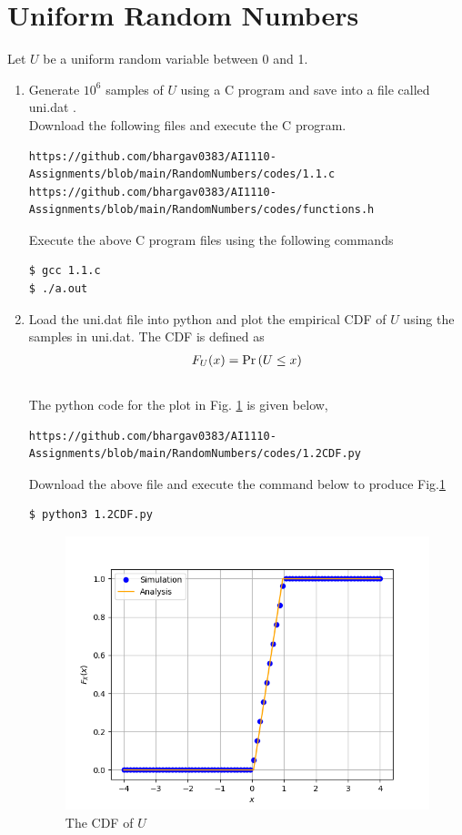 \documentclass[journal,12pt,twocolumn]{IEEEtran}
\begin{document}
\section{Uniform Random Numbers}
Let $U$ be a uniform random variable between 0 and 1.
\begin{enumerate}[label=\thesection.\arabic*
,ref=\thesection.\theenumi]

\item Generate $10^6$ samples of $U$ using a C program and save into a file called uni.dat .
\\
\solution Download the following files and execute the  C program.
\begin{lstlisting}
https://github.com/bhargav0383/AI1110-Assignments/blob/main/RandomNumbers/codes/1.1.c
https://github.com/bhargav0383/AI1110-Assignments/blob/main/RandomNumbers/codes/functions.h
\end{lstlisting}
Execute the above C program files using the following commands
\begin{lstlisting}
$ gcc 1.1.c
$ ./a.out
\end{lstlisting}

\item
Load the uni.dat file into python and plot the empirical CDF of $U$ using the samples in uni.dat. The CDF is defined as
\begin{align}
F_{U}(x) = \Pr\left(U \le x\right)
\end{align}
\\
\solution  The python code for the plot in Fig. \ref{fig:1.2} is given below,
\begin{lstlisting}
https://github.com/bhargav0383/AI1110-Assignments/blob/main/RandomNumbers/codes/1.2CDF.py
\end{lstlisting}
Download the above file and execute the command below to produce Fig.\ref{fig:1.2}
\begin{lstlisting}
$ python3 1.2CDF.py
\end{lstlisting}
\begin{figure}[!h]
\centering
\includegraphics[width=\columnwidth]{./figs/1.2CDF.png}
\caption{The CDF of $U$}
\label{fig:1.2}
\end{figure}
%


\end{enumerate}
\end{document}
